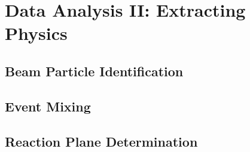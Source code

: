 \chapter{Data Analysis II: Extracting Physics}
\section{Beam Particle Identification}
\section{Event Mixing}
\section{Reaction Plane Determination}

